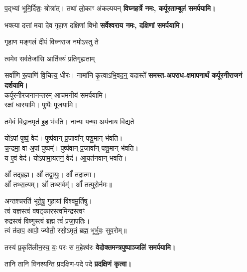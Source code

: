 \begin{center}
{प॒द्भ्यां भूमि॒र्दिशः॒ श्रोत्रा᳚त्। तथा॑ लो॒काꣳ अ॑कल्पयन्}
\textbf{विघ्नहर्त्रे नमः, कर्पूरताम्बूलं समर्पयामि।}
\medskip


{भक्त्या दत्तां मया देव गृहाण दक्षिणां विभो}
\textbf{सर्वेश्वराय नमः, दक्षिणां समर्पयामि।}
\medskip

{गृहाण मङ्गलं दीपं विघ्नराज नमोऽस्तु ते}

{त्वमेव सर्वतेजांसि आर्तिक्यं प्रतिगृह्यताम्}

{सर्वा॑णि रू॒पाणि॑ वि॒चित्य॒ धीरः॑। नामा॑नि कृ॒त्वाऽभि॒वद॒न्॒ यदास्ते᳚}
\textbf{\devAya{} समस्त-अपराध-क्षमापनार्थं कर्पूरनीराजनं दर्शयामि।\\}
कर्पूरनीरजनानन्तरम् आचमनीयं समर्पयामि।\\
रक्षां धारयामि। पुष्पैः पूजयामि।
\medskip

{तमे॒वं वि॒द्वान॒मृत॑ इ॒ह भ॑वति। नान्यः पन्था॒ अय॑नाय विद्यते}

यो॑ऽपां पुष्पं॒ वेद॑। पुष्प॑वान् प्र॒जावा᳚न् पशु॒मान् भ॑वति।\\
च॒न्द्रमा॒ वा अ॒पां पुष्पम्᳚। पुष्प॑वान् प्र॒जावा᳚न् पशु॒मान् भ॑वति।\\
य ए॒वं वेद॑। यो॑ऽपामा॒यत॑नं॒ वेद॑। आ॒यत॑नवान् भवति।\medskip

ओं᳚ तद्ब्र॒ह्म। ओं᳚ तद्वा॒युः। ओं᳚ तदा॒त्मा।\\
ओं᳚ तथ्स॒त्यम्‌। ओं᳚ तथ्सर्वम्᳚‌। ओं᳚ तत्पुरो॒र्नमः॥\medskip

अन्तश्चरति॑ भूते॒षु॒ गुहायां वि॑श्वमू॒र्तिषु।\\
त्वं यज्ञस्त्वं वषट्कारस्त्वमिन्द्रस्त्वꣳ\\
रुद्रस्त्वं विष्णुस्त्वं ब्रह्म त्वं॑ प्रजा॒पतिः।\\
त्वं त॑दाप॒ आपो॒ ज्योती॒ रसो॒ऽमृतं॒ ब्रह्म॒ भूर्भुवः॒ सुव॒रोम्‌॥\medskip

{तस्य॑ प्र॒कृति॑लीन॒स्य॒ यः॒ परः॑ स म॒हेश्व॑रः}
\textbf{\devAya{} वेदोक्तमन्त्रपुष्पाञ्जलिं समर्पयामि।}
\medskip

{तानि तानि विनश्यन्ति प्रदक्षिण-पदे पदे}
\textbf{प्रदक्षिणं कृत्वा।}
\medskip


\end{center}
